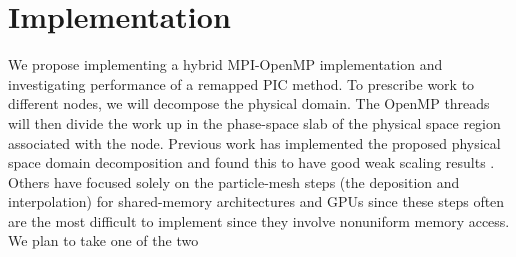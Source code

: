 \documentclass[aps,12pt]{revtex4-1}
\renewcommand{\=}[1]{\overline{#1}}
\begin{document}
\section{Implementation}

We propose implementing a hybrid MPI-OpenMP implementation and investigating performance of a remapped PIC method. To prescribe work to different nodes, we will decompose the physical domain. The OpenMP threads will then divide the work up in the phase-space slab of the physical space region associated with the node. Previous work has implemented the proposed physical space domain decomposition and found this to have good weak scaling results \cite{wang2011particle}. Others have focused solely on the particle-mesh steps (the deposition and interpolation) for shared-memory architectures \cite{madduri2012optimization} and GPUs \cite{stantchev2008fast, buyukkecceci2013portable} since these steps often are the most difficult to implement since they involve nonuniform memory access. We plan to take one of the two     



\renewcommand{\refname}{\normalsize\textbf References}
{}
\end{document}
